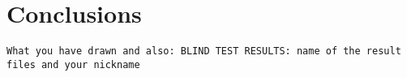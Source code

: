 \section{Conclusions}
\texttt{What you have drawn and also:
BLIND TEST RESULTS: name of the result files  and your nickname}